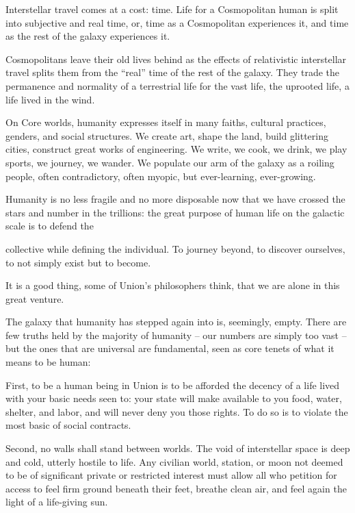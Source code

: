 Interstellar travel comes at a cost: time. Life for a Cosmopolitan human is split into subjective  
and real time, or, time as a Cosmopolitan experiences it, and time as the rest of the galaxy  
experiences it. 
 

Cosmopolitans leave their old lives behind as the effects of relativistic interstellar travel splits  
them from the “real” time of the rest of the galaxy. They trade the permanence and normality of a  
terrestrial life for the vast life, the uprooted life, a life lived in the wind. 
 

On Core worlds, humanity expresses itself in many faiths, cultural practices, genders, and social  
structures. We create art, shape the land, build glittering cities, construct great works of  
engineering. We write, we cook, we drink, we play sports, we journey, we wander. We populate  
our arm of the galaxy as a roiling people, often contradictory, often myopic, but ever-learning,  
ever-growing.  
 

Humanity is no less fragile and no more disposable now that we have crossed the stars and  
number in the trillions: the great purpose of human life on the galactic scale is to defend the  

                                                                                                              


collective while defining the individual. To journey beyond, to discover ourselves, to not simply  
exist but to become. 
 

It is a good thing, some of Union’s philosophers think, that we are alone in this great venture. 
 

The galaxy that humanity has stepped again into is, seemingly, empty. There are few truths held  
by the majority of humanity -- our numbers are simply too vast -- but the ones that are universal  
are fundamental, seen as core tenets of what it means to be human: 
 

First, to be a human being in Union is to be afforded the decency of a life lived with your basic  
needs seen to: your state will make available to you food, water, shelter, and labor, and will never  
deny you those rights. To do so is to violate the most basic of social contracts. 
 

Second, no walls shall stand between worlds. The void of interstellar space is deep and cold,  
utterly hostile to life. Any civilian world, station, or moon not deemed to be of significant private  
or restricted interest must allow all who petition for access to feel firm ground beneath their feet,  
breathe clean air, and feel again the light of a life-giving sun. 
 

